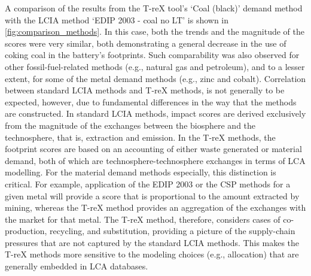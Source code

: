 A comparison of the results from the T-reX tool's `Coal (black)' demand method with the LCIA method `EDIP 2003 - coal no LT' is shown in \autoref{fig:comparison_methods}. In this case, both the trends and the magnitude of the scores were very similar, both demonstrating a general decrease in the use of coking coal in the battery's footprints. Such comparability was also observed for other fossil-fuel-related methods (e.g., natural gas and petroleum), and to a lesser extent, for some of the metal demand methods (e.g., zinc and cobalt). Correlation between standard LCIA methods and T-reX methods, is not generally to be expected, however, due to fundamental differences in the way that the methods are constructed. In standard LCIA methods, impact scores are derived exclusively from the magnitude of the exchanges between the biosphere and the technosphere, that is, extraction and emission. In the T-reX methods, the footprint scores are based on an accounting of either waste generated or material demand, both of which are technosphere-technosphere exchanges in terms of LCA modelling. For the material demand methods especially, this distinction is critical. For example, application of the EDIP 2003 or the CSP methods for a given metal will provide a score that is proportional to the amount extracted by mining, whereas the T-reX method provides an aggregation of the exchanges with the market for that metal. The T-reX method, therefore, considers cases of co-production, recycling, and substitution, providing a picture of the supply-chain pressures that are not captured by the standard LCIA methods. This makes the T-reX methods more sensitive to the modeling choices (e.g., allocation) that are generally embedded in LCA databases.

